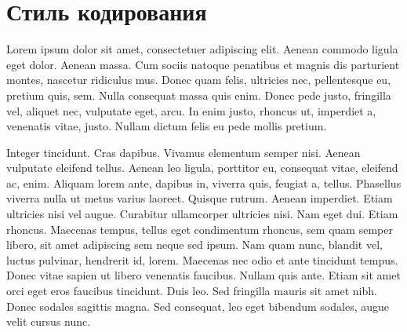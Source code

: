 \chapter{Стиль кодирования}

Lorem ipsum dolor sit amet, consectetuer adipiscing elit. Aenean commodo
ligula eget dolor. Aenean massa. Cum sociis natoque penatibus et magnis dis
parturient montes, nascetur ridiculus mus. Donec quam felis, ultricies nec,
pellentesque eu, pretium quis, sem. Nulla consequat massa quis enim. Donec
pede justo, fringilla vel, aliquet nec, vulputate eget, arcu. In enim justo,
rhoncus ut, imperdiet a, venenatis vitae, justo. Nullam dictum felis eu pede
mollis pretium.

Integer tincidunt. Cras dapibus. Vivamus elementum semper nisi. Aenean
vulputate eleifend tellus. Aenean leo ligula, porttitor eu, consequat vitae,
eleifend ac, enim. Aliquam lorem ante, dapibus in, viverra quis, feugiat a,
tellus. Phasellus viverra nulla ut metus varius laoreet. Quisque rutrum.
Aenean imperdiet. Etiam ultricies nisi vel augue. Curabitur ullamcorper
ultricies nisi. Nam eget dui. Etiam rhoncus. Maecenas tempus, tellus eget
condimentum rhoncus, sem quam semper libero, sit amet adipiscing sem neque sed
ipsum. Nam quam nunc, blandit vel, luctus pulvinar, hendrerit id, lorem.
Maecenas nec odio et ante tincidunt tempus. Donec vitae sapien ut libero
venenatis faucibus. Nullam quis ante. Etiam sit amet orci eget eros faucibus
tincidunt. Duis leo. Sed fringilla mauris sit amet nibh. Donec sodales
sagittis magna. Sed consequat, leo eget bibendum sodales, augue velit cursus
nunc.
